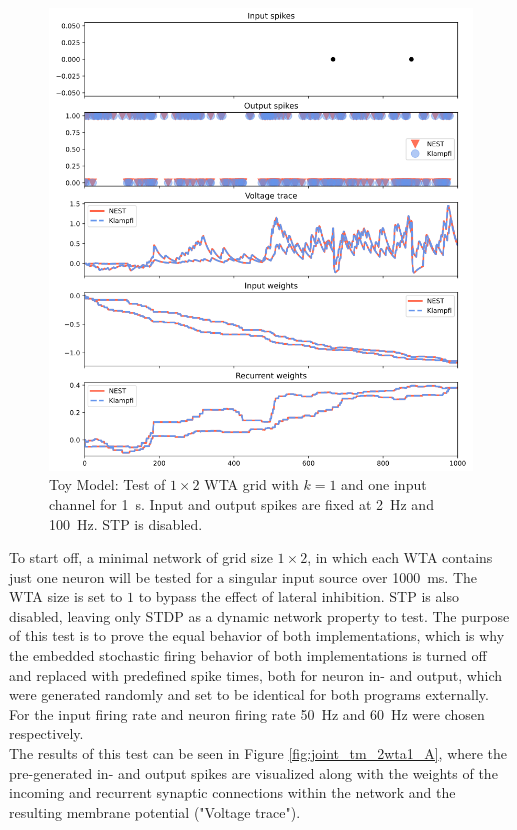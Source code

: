 \begin{figure}[htbp]
    \centering
    \includegraphics[width=\columnwidth]{Figures/joint_tm_2wta1_B.png}
    \caption{Toy Model: Test of $1\times 2$ WTA grid with $k=1$ and one input channel for \SI{1}{\second}. Input and output spikes are fixed at \SI{2}{\hertz} and \SI{100}{\hertz}. STP is disabled.}
    \label{fig:joint_tm_2wta1_B}
\end{figure}
To start off, a minimal network of grid size $1\times2$, in which each WTA contains just one neuron will be tested for a singular input source over \SI{1000}{\milli\second}. The WTA size is set to $1$ to bypass the effect of lateral inhibition. STP is also disabled, leaving only STDP as a dynamic network property to test. The purpose of this test is to prove the equal behavior of both implementations, which is why the embedded stochastic firing behavior of both implementations is turned off and replaced with predefined spike times, both for neuron in- and output, which were generated randomly and set to be identical for both programs externally. For the input firing rate and neuron firing rate \SI{50}{\hertz} and \SI{60}{\hertz} were chosen respectively.\\
The results of this test can be seen in Figure \ref{fig:joint_tm_2wta1_A}, where the pre-generated in- and output spikes are visualized along with the weights of the incoming and recurrent synaptic connections within the network and the resulting membrane potential ("Voltage trace").\\
